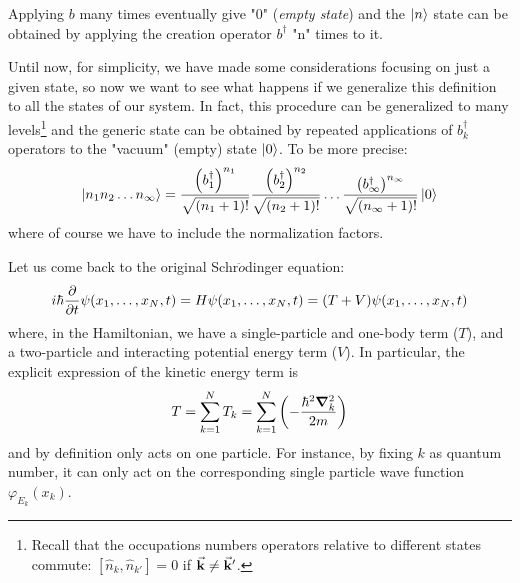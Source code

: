 \documentclass[../main/main.tex]{subfiles}
\begin{document}
\begin{remark}
Applying \( b \) many times eventually give "0" (\emph{empty state}) and the \( \ket{n}  \) state can be obtained by applying the creation operator \( b^\dag \) "n" times to it.
\end{remark}

Until now, for simplicity, we have made some considerations focusing on just a given state, so now we want to see what happens if we generalize this definition to all the states of our system.
In fact, this procedure can be generalized to many levels\footnote{Recall that the occupations numbers operators relative to different states commute: \( [\hat{n}_k, \hat{n}_{k'}  ]=0 \) if \( \va{k}\neq \va{k}' \).} and the generic state can be obtained by repeated applications of \( b^\dag_k \) operators to the "vacuum" (empty) state \( \ket{0}  \).
To be more precise:  
\begin{equation*} 
  \ket{n_1 n_2 \dots n_ \infty } = \frac{\qty(b_1^\dag)^{n_1} }{\sqrt{(n_1+1)!} } \frac{\qty(b_2^\dag)^{n_2} }{\sqrt{(n_2+1)!} }
  \dots \frac{\qty(b_ \infty ^\dag)^{n_ \infty } }{\sqrt{(n_ \infty +1)!} } \ket{0}
\end{equation*}
where of course we have to include the normalization factors.

Let us come back to the original Schr$\ddot{o}$dinger equation:
\begin{equation*}
  i \hbar \pdv{}{t} \psi (x_1, \dots, x_N, t) = H  \psi (x_1, \dots, x_N, t) = (T + V) \psi (x_1, \dots, x_N, t)
\end{equation*}
where, in the Hamiltonian, we have a single-particle and one-body term (\( T \)), and a two-particle and interacting potential energy term (\( V \)).
In particular, the explicit expression of the kinetic energy term is
\begin{equation*}
  T = \sum_{k=1}^{N} T_k =  \sum_{k=1}^{N} \qty(- \frac{\hbar ^2 \grad ^2_k}{2m})
\end{equation*}
and by definition only acts on one particle. For instance, by fixing \( k \) as quantum number, it can only act on the corresponding single particle wave function \( \varphi _{E_k} (x_k) \).
\end{document}
